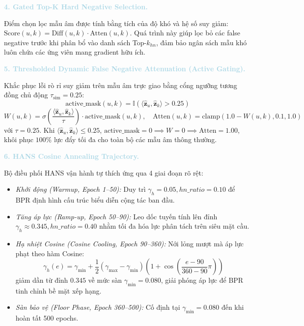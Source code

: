 \noindent\textcolor{lightblue}{\textbf{4. Gated Top-K Hard Negative Selection.}}

Điểm chọn lọc mẫu âm được tính bằng tích của độ khó và hệ số suy giảm: $\text{Score}(u, k) = \text{Diff}(u, k) \cdot \text{Atten}(u, k)$. Quá trình này giúp lọc bỏ các false negative trước khi phân bổ vào danh sách Top-$k_{hn}$, đảm bảo ngân sách mẫu khó luôn chứa các ứng viên mang gradient hữu ích. 

\noindent\textcolor{lightblue}{\textbf{5. Thresholded Dynamic False Negative Attenuation (Active Gating).}}

Khắc phục lỗi rò rỉ suy giảm trên mẫu âm trực giao bằng cổng ngưỡng tương đồng chủ động $\tau_{\text{sim}} = 0.25$:
\begin{equation}
\text{active\_mask}(u, k) = \mathbb{I}(\langle \hat{\mathbf{z}}_u, \hat{\mathbf{z}}_k \rangle > 0.25)
\end{equation}
\begin{equation}
W(u, k) = \sigma\left(\frac{\langle \hat{\mathbf{z}}_u, \hat{\mathbf{z}}_k \rangle}{\tau}\right) \cdot \text{active\_mask}(u, k), \quad \text{Atten}(u, k) = \text{clamp}(1.0 - W(u, k), 0.1, 1.0)
\end{equation}
với $\tau = 0.25$. Khi $\langle \hat{\mathbf{z}}_u, \hat{\mathbf{z}}_k \rangle \le 0.25$, $\text{active\_mask} = 0 \implies W = 0 \implies \text{Atten} = 1.00$, khôi phục $100\%$ lực đẩy tối đa cho toàn bộ các mẫu âm thông thường.

\noindent\textcolor{lightblue}{\textbf{6. HANS Cosine Annealing Trajectory.}}

Bộ điều phối HANS vận hành tự thích ứng qua 4 giai đoạn rõ rệt:
\begin{itemize}[leftmargin=*]
    \item \textit{Khởi động (Warmup, Epoch 1--50):} Duy trì $\gamma_h = 0.05, hn\_ratio = 0.10$ để BPR định hình cấu trúc biểu diễn cộng tác ban đầu.
    \item \textit{Tăng áp lực (Ramp-up, Epoch 50--90):} Leo dốc tuyến tính lên đỉnh $\gamma_h \approx 0.345, hn\_ratio = 0.40$ nhằm tối đa hóa lực phân tách trên siêu mặt cầu.
    \item \textit{Hạ nhiệt Cosine (Cosine Cooling, Epoch 90--360):} Nới lỏng mượt mà áp lực phạt theo hàm Cosine:
    \begin{equation}
    \gamma_h(e) = \gamma_{\text{min}} + \frac{1}{2}(\gamma_{\text{max}} - \gamma_{\text{min}})\left(1 + \cos\left(\frac{e - 90}{360 - 90}\pi\right)\right)
    \end{equation}
    giảm dần từ đỉnh $0.345$ về mức sàn $\gamma_{\text{min}} = 0.080$, giải phóng áp lực để BPR tinh chỉnh bề mặt xếp hạng.
    \item \textit{Sàn bảo vệ (Floor Phase, Epoch 360--500):} Cố định tại $\gamma_{\text{min}} = 0.080$ đến khi hoàn tất 500 epochs.
\end{itemize}

